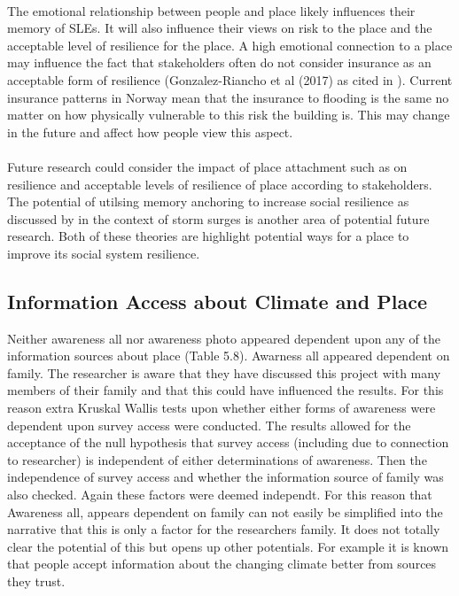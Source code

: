 \paragraph{}

The emotional relationship between people and place likely influences their memory of SLEs. It will also influence their views on risk to the place and the acceptable level of resilience for the place. A high emotional connection to a place may influence the fact that stakeholders often do not consider insurance as an acceptable form of resilience (Gonzalez-Riancho et al (2017) as cited in \cite{gerkensmeier_governing_2018}). Current insurance patterns in Norway mean that the insurance to flooding is the same no matter on how physically vulnerable to this risk the building is. This may change in the future and affect how people view this aspect.
\paragraph{}
Future research could consider the impact of place attachment such as \cite{ariccio_place_2021} on resilience and acceptable levels of resilience of place according to stakeholders. The potential of utilsing memory anchoring to increase social resilience as discussed by \cite{de_guttry_expiry_2022} in the context of storm surges is another area of potential future research. Both of these theories are highlight potential ways for a place to improve its social system resilience. 

\subsection{Information Access about Climate and Place}
Neither awareness all nor awareness photo appeared dependent upon any of the information sources about place  (Table 5.8). Awarness all appeared dependent on family. The researcher is aware that they have discussed this project with many members of their family and that this could have influenced the results. For this reason extra Kruskal Wallis tests upon whether either forms of awareness were dependent upon survey access were conducted. The results allowed for the acceptance of the null hypothesis that survey access (including due to connection to researcher) is independent of either determinations of awareness. Then the independence of survey access and whether the information source of family was also checked. Again these factors were deemed independt. For this reason that Awareness all, appears dependent on family can not easily be simplified into the narrative that this is only a factor for the researchers family. It does not totally clear the potential of this but opens up other potentials. For example it is known that people accept information about the changing climate better from sources they trust. 

